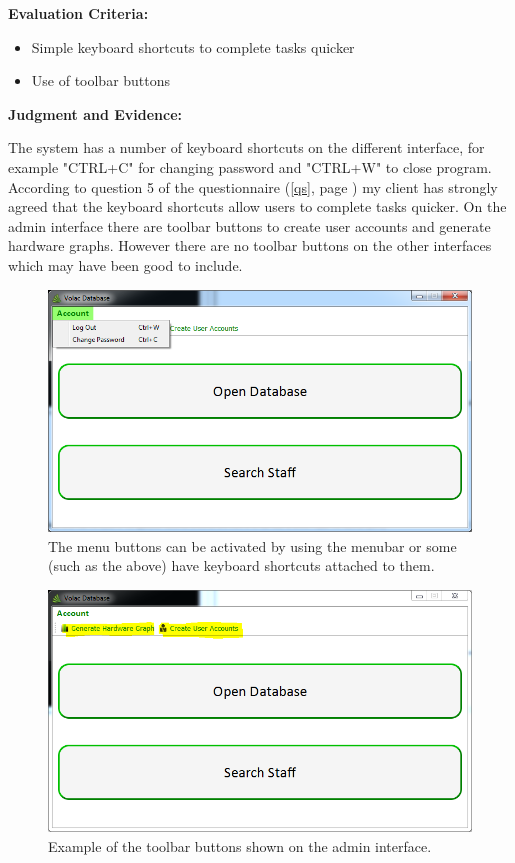 \textbf{Evaluation Criteria:}
\begin{itemize}
\item{Simple keyboard shortcuts to complete tasks quicker}
\item{Use of toolbar buttons}
\end{itemize}

\textbf{Judgment and Evidence:}

The system has a number of keyboard shortcuts on the different interface, for example "CTRL+C" for changing password and "CTRL+W" to close program. According to question 5 of the questionnaire (\ref{qs}, page \pageref{qs}) my client has strongly agreed that the keyboard shortcuts allow users to complete tasks quicker. On the admin interface there are toolbar buttons to create user accounts and generate hardware graphs. However there are no toolbar buttons on the other interfaces which may have been good to include.

\begin{figure}[H]
    \includegraphics[width=\textwidth]{./Evaluation/Images/shortcuts1.png}
    \caption{The menu buttons can be activated by using the menubar or some (such as the above) have keyboard shortcuts attached to them.} 
\end{figure}

\begin{figure}[H]
    \includegraphics[width=\textwidth]{./Evaluation/Images/toolbarbtns.png}
    \caption{Example of the toolbar buttons shown on the admin interface.} 
\end{figure}

